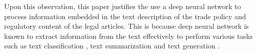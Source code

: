 Upon this observation, this paper justifies the use a deep neural network to process information embedded in the text description of the trade policy and regulatory content of the legal articles. This is because deep neural network is known to 
extract information from the text effectively to perform various tasks such as text classification \citep{minaee2020deep}, text summarization \citep{textsum} and text generation \citep{guo2017long}.




